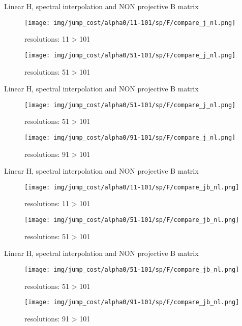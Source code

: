 \documentclass[francais]{beamer}
\begin{document}
\begin{frame}{Linear H, spectral interpolation and NON projective B matrix}
\begin{center}
\begin{figure}
  \texttt{[image: img/jump\_cost/alpha0/11-101/sp/F/compare\_j\_nl.png]}
  \caption{resolutions: 11 > 101}
\endminipage\hfill
{}
  \texttt{[image: img/jump\_cost/alpha0/51-101/sp/F/compare\_j\_nl.png]}
  \caption{resolutions: 51 > 101}
\endminipage
\end{figure}
\end{center}
\end{frame}

\begin{frame}{Linear H, spectral interpolation and NON projective B matrix}
\begin{center}
\begin{figure}
  \texttt{[image: img/jump\_cost/alpha0/51-101/sp/F/compare\_j\_nl.png]}
  \caption{resolutions: 51 > 101}
\endminipage\hfill
{}
  \texttt{[image: img/jump\_cost/alpha0/91-101/sp/F/compare\_j\_nl.png]}
  \caption{resolutions: 91 > 101}
\endminipage
\end{figure}
\end{center}
\end{frame}

\begin{frame}{Linear H, spectral interpolation and NON projective B matrix}
\begin{center}
\begin{figure}
  \texttt{[image: img/jump\_cost/alpha0/11-101/sp/F/compare\_jb\_nl.png]}
  \caption{resolutions: 11 > 101}
\endminipage\hfill
{}
  \texttt{[image: img/jump\_cost/alpha0/51-101/sp/F/compare\_jb\_nl.png]}
  \caption{resolutions: 51 > 101}
\endminipage
\end{figure}
\end{center}
\end{frame}

\begin{frame}{Linear H, spectral interpolation and NON projective B matrix}
\begin{center}
\begin{figure}
  \texttt{[image: img/jump\_cost/alpha0/51-101/sp/F/compare\_jb\_nl.png]}
  \caption{resolutions: 51 > 101}
\endminipage\hfill
{}
  \texttt{[image: img/jump\_cost/alpha0/91-101/sp/F/compare\_jb\_nl.png]}
  \caption{resolutions: 91 > 101}
\endminipage
\end{figure}
\end{center}
\end{frame}
\end{document}
